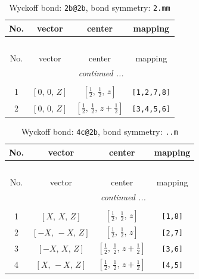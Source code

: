 \documentclass[fleqn,8pt]{jsarticle}
\begin{document}
\renewcommand{\arraystretch}{1.2}
\begin{longtable}{cccc}
\caption{Wyckoff bond: {\tt 2b@2b}, bond symmetry: {\tt 2.mm}}
 \\
 \hline \hline
No. & vector & center & mapping \\ \hline \endfirsthead

\multicolumn{3}{l}{\tablename\ \thetable{}} \\
 \hline \hline
No. & vector & center & mapping \\ \hline \endhead

 \hline \hline
\multicolumn{3}{r}{\footnotesize\it continued ...} \\ \endfoot

 \hline \hline
\multicolumn{3}{r}{} \\ \endlastfoot

1 & $\left[ 0,\, 0,\, Z \right]$ & $\left[ \frac{1}{2},\, \frac{1}{2},\, z \right]$ & {\tt [1,2,7,8]} \\ \hline
2 & $\left[ 0,\, 0,\, Z \right]$ & $\left[ \frac{1}{2},\, \frac{1}{2},\, z + \frac{1}{2} \right]$ & {\tt [3,4,5,6]} \\
\end{longtable}
\renewcommand{\arraystretch}{1.2}
\begin{longtable}{cccc}
\caption{Wyckoff bond: {\tt 4c@2b}, bond symmetry: {\tt ..m}}
 \\
 \hline \hline
No. & vector & center & mapping \\ \hline \endfirsthead

\multicolumn{3}{l}{\tablename\ \thetable{}} \\
 \hline \hline
No. & vector & center & mapping \\ \hline \endhead

 \hline \hline
\multicolumn{3}{r}{\footnotesize\it continued ...} \\ \endfoot

 \hline \hline
\multicolumn{3}{r}{} \\ \endlastfoot

1 & $\left[ X,\, X,\, Z \right]$ & $\left[ \frac{1}{2},\, \frac{1}{2},\, z \right]$ & {\tt [1,8]} \\ \hline
2 & $\left[ - X,\, - X,\, Z \right]$ & $\left[ \frac{1}{2},\, \frac{1}{2},\, z \right]$ & {\tt [2,7]} \\ \hline
3 & $\left[ - X,\, X,\, Z \right]$ & $\left[ \frac{1}{2},\, \frac{1}{2},\, z + \frac{1}{2} \right]$ & {\tt [3,6]} \\ \hline
4 & $\left[ X,\, - X,\, Z \right]$ & $\left[ \frac{1}{2},\, \frac{1}{2},\, z + \frac{1}{2} \right]$ & {\tt [4,5]} \\
\end{longtable}
\end{document}
